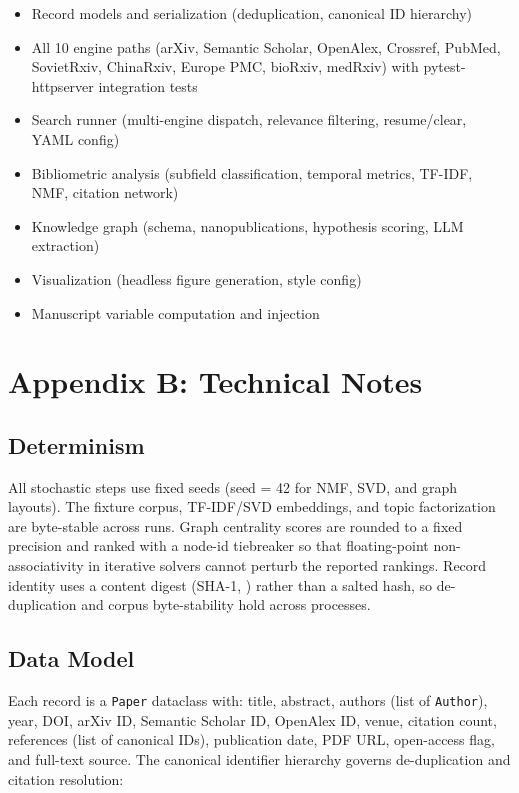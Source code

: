 \documentclass[
  english,
]{article}
\providecommand{\tightlist}{%
  \setlength{\itemsep}{0pt}\setlength{\parskip}{0pt}}
\begin{document}
\begin{itemize}
\tightlist
\item
  Record models and serialization (deduplication, canonical ID
  hierarchy)
\item
  All 10 engine paths (arXiv, Semantic Scholar, OpenAlex, Crossref,
  PubMed, SovietRxiv, ChinaRxiv, Europe PMC, bioRxiv, medRxiv) with
  pytest-httpserver integration tests
\item
  Search runner (multi-engine dispatch, relevance filtering,
  resume/clear, YAML config)
\item
  Bibliometric analysis (subfield classification, temporal metrics,
  TF-IDF, NMF, citation network)
\item
  Knowledge graph (schema, nanopublications, hypothesis scoring, LLM
  extraction)
\item
  Visualization (headless figure generation, style config)
\item
  Manuscript variable computation and injection
\end{itemize}

\newpage

\section{Appendix B: Technical Notes}\label{appendix-b-technical-notes}

\subsection{Determinism}\label{determinism}

All stochastic steps use fixed seeds (seed = 42 for NMF, SVD, and graph
layouts). The fixture corpus, TF-IDF/SVD embeddings, and topic
factorization are byte-stable across runs. Graph centrality scores are
rounded to a fixed precision and ranked with a node-id tiebreaker so
that floating-point non-associativity in iterative solvers cannot
perturb the reported rankings. Record identity uses a content digest
(SHA-1, ) rather than a salted hash, so
de-duplication and corpus byte-stability hold across processes.

\subsection{Data Model}\label{data-model}

Each record is a \texttt{Paper} dataclass with: title, abstract, authors
(list of \texttt{Author}), year, DOI, arXiv ID, Semantic Scholar ID,
OpenAlex ID, venue, citation count, references (list of canonical IDs),
publication date, PDF URL, open-access flag, and full-text source. The
canonical identifier hierarchy governs de-duplication and citation
resolution:
\end{document}
